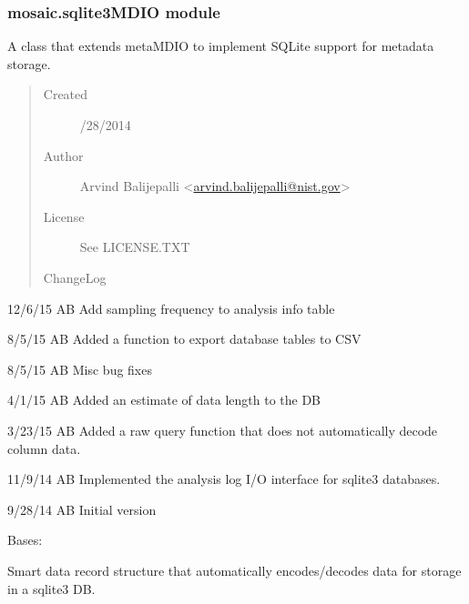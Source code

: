 \documentclass[letterpaper,10pt,english]{sphinxmanual}
\begin{document}
\subsubsection{mosaic.sqlite3MDIO module}
\label{api-doc/mosaic.output:mosaic-sqlite3mdio-module}\label{api-doc/mosaic.output:module-mosaic.sqlite3MDIO}
A class that extends metaMDIO to implement SQLite support for metadata storage.
\begin{quote}\begin{description}
\item[{Created}] /28/2014

\item[{Author}] \leavevmode
Arvind Balijepalli \textless{}\href{mailto:arvind.balijepalli@nist.gov}{arvind.balijepalli@nist.gov}\textgreater{}

\item[{License}] \leavevmode
See LICENSE.TXT

\item[{ChangeLog}] \leavevmode
\end{description}\end{quote}

\begin{DUlineblock}{0em}
\item[] 12/6/15         AB      Add sampling frequency to analysis info table
\item[] 8/5/15          AB      Added a function to export database tables to CSV
\item[] 8/5/15          AB      Misc bug fixes
\item[] 4/1/15          AB      Added an estimate of data length to the DB
\item[] 3/23/15         AB      Added a raw query function that does not automatically decode column data.
\item[] 11/9/14         AB  Implemented the analysis log I/O interface for sqlite3 databases.
\item[] 9/28/14         AB      Initial version
\end{DUlineblock}

\begin{fulllineitems}
\label{api-doc/mosaic.output:mosaic.sqlite3MDIO.data_record}
Bases: \href{http://docs.python.org/library/stdtypes.html\#dict}{}

Smart data record structure that automatically encodes/decodes data for storage
in a sqlite3 DB.

\end{fulllineitems}
\end{document}
